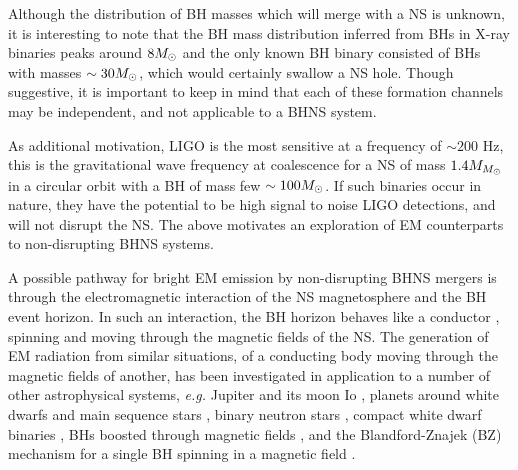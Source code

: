 Although the distribution of BH masses which will merge with
a NS is unknown, it is interesting to note that the BH mass distribution
inferred from BHs in X-ray binaries peaks around $8 {M_{\odot}}$ \citep{Ozel:2010}
and the only known BH binary consisted of BHs with masses $\sim 30 {M_{\odot}}$, which
would certainly swallow a NS hole. Though suggestive, it is important to keep
in mind that each of these formation channels may be independent, and not
applicable to a BHNS system.

As additional motivation, LIGO is the most sensitive at a frequency of $\sim
200$ Hz, this is the gravitational wave frequency at coalescence for a NS of
mass $1.4 M_{{M_{\odot}}}$ in a circular orbit with a BH of mass few $\sim100
{M_{\odot}}$. If such binaries occur in nature, they have the potential to be high
signal to noise LIGO detections, and will not disrupt the NS. The
above motivates an exploration of EM counterparts to non-disrupting BHNS
systems.


A possible pathway for bright EM emission by non-disrupting BHNS mergers is
through the electromagnetic interaction of the NS magnetosphere and the BH
event horizon. In such an interaction, the BH horizon behaves like a conductor
\citep[see][and Chapter \ref{ch:Rindler}]{MPBook}, spinning and moving through
the magnetic fields of the NS. The generation of EM radiation from similar
situations, of a conducting body moving through the magnetic fields of
another, has been investigated in application to a number of other
astrophysical systems, \textit{e.g.} Jupiter and its moon Io \citep{GLB:1969},
planets around white dwarfs \citep{Li:1998} and main sequence stars
\citep{LaineLinI:2012,LaineLinII:2012}, binary neutron stars
\citep{Vietri:1996,Piro:2012, DLai:2012, Palenzuela:2013}, compact white dwarf
binaries \citep{Wu:2002, Dall'Osso:2006, Dall'Osso:2007, DLai:2012}, BHs
boosted through magnetic fields \citep{Lyut:2011, Penna:2015}, and the
Blandford-Znajek (BZ) mechanism \citep{BZ:1977} for a single BH spinning in a
magnetic field  \citep[for recent numerical work on the BZ mechanism see \textit{e.g.}][]{PalenzuelaBZ:2011, Kiuchi:2015}.


